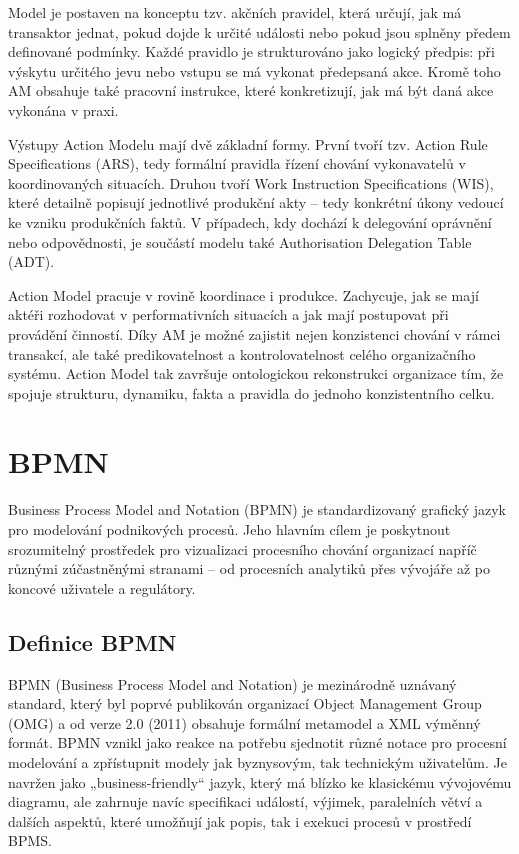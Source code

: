 Model je postaven na konceptu tzv. akčních pravidel, která určují, jak má transaktor jednat, pokud dojde k určité události nebo pokud jsou splněny předem definované podmínky. Každé pravidlo je strukturováno jako logický předpis: při výskytu určitého jevu nebo vstupu se má vykonat předepsaná akce. Kromě toho AM obsahuje také pracovní instrukce, které konkretizují, jak má být daná akce vykonána v praxi. \cite{Dietz2020}

Výstupy Action Modelu mají dvě základní formy. První tvoří tzv. Action Rule Specifications (ARS), tedy formální pravidla řízení chování vykonavatelů v koordinovaných situacích. Druhou tvoří Work Instruction Specifications (WIS), které detailně popisují jednotlivé produkční akty – tedy konkrétní úkony vedoucí ke vzniku produkčních faktů. V případech, kdy dochází k delegování oprávnění nebo odpovědnosti, je součástí modelu také Authorisation Delegation Table (ADT). \cite{Pergl2023DEMO_modely}

Action Model pracuje v rovině koordinace i produkce. Zachycuje, jak se mají aktéři rozhodovat v performativních situacích a jak mají postupovat při provádění činností. Díky AM je možné zajistit nejen konzistenci chování v rámci transakcí, ale také predikovatelnost a kontrolovatelnost celého organizačního systému. Action Model tak završuje ontologickou rekonstrukci organizace tím, že spojuje strukturu, dynamiku, fakta a pravidla do jednoho konzistentního celku. \cite{Dietz2020}

\section{BPMN}
\label{sec:bpmn}

Business Process Model and Notation (BPMN) je standardizovaný grafický jazyk pro modelování podnikových procesů. Jeho hlavním cílem je poskytnout srozumitelný prostředek pro vizualizaci procesního chování organizací napříč různými zúčastněnými stranami – od procesních analytiků přes vývojáře až po koncové uživatele a regulátory. \cite{Aagesen2015}


\subsection{Definice BPMN}
\label{sec:definice-bpmn}

BPMN (Business Process Model and Notation) je mezinárodně uznávaný standard, který byl poprvé publikován organizací Object Management Group (OMG) a od verze 2.0 (2011) obsahuje formální metamodel a XML výměnný formát. BPMN vznikl jako reakce na potřebu sjednotit různé notace pro procesní modelování a zpřístupnit modely jak byznysovým, tak technickým uživatelům. Je navržen jako „business-friendly“ jazyk, který má blízko ke klasickému vývojovému diagramu, ale zahrnuje navíc specifikaci událostí, výjimek, paralelních větví a dalších aspektů, které umožňují jak popis, tak i exekuci procesů v prostředí BPMS. \cite{Aagesen2015,Pergl2023BPMN}

